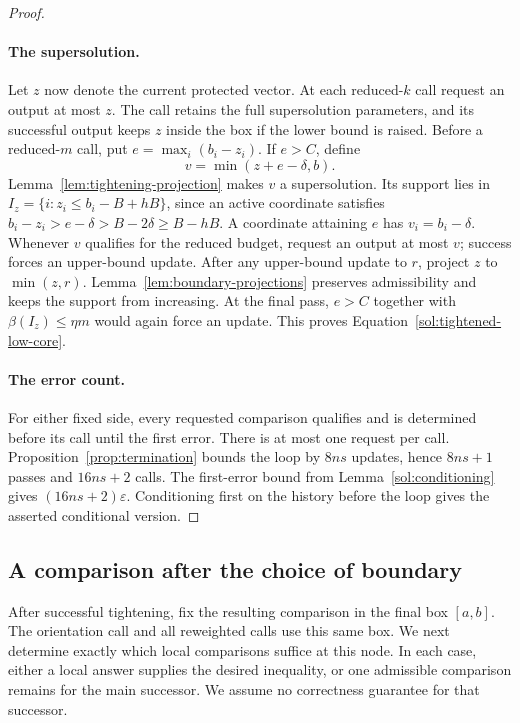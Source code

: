 \begin{proof}
\paragraph{The supersolution.}
Let \(z\) now denote the current protected vector. At each
reduced-\(k\) call request an output at most \(z\). The call
retains the full supersolution parameters, and its successful output
keeps \(z\) inside the box if the lower bound is raised.
Before a reduced-\(m\) call, put \(e=\max_i(b_i-z_i)\). If
\(e>C\), define
\[
 v=\min(z+e-\delta,b).
\]
Lemma~\ref{lem:tightening-projection} makes \(v\) a supersolution.
Its support lies in \(I_z=\{i:z_i\le b_i-B+hB\}\), since an
active coordinate satisfies
\(b_i-z_i>e-\delta>B-2\delta\ge B-hB\).
A coordinate attaining \(e\) has \(v_i=b_i-\delta\).
Whenever \(v\) qualifies for the reduced budget, request an output
at most \(v\); success forces an upper-bound update. After any
upper-bound update to \(r\), project \(z\) to \(\min(z,r)\).
Lemma~\ref{lem:boundary-projections} preserves admissibility and
keeps the support from increasing. At the final pass, \(e>C\)
together with \(\beta(I_z)\le\eta m\) would again force an update.
This proves Equation~\eqref{sol:tightened-low-core}.

\paragraph{The error count.}
For either fixed side, every requested comparison qualifies and is
determined before its call until the first error. There is at most
one request per call. Proposition~\ref{prop:termination} bounds the
loop by \(8ns\) updates, hence \(8ns+1\) passes and \(16ns+2\)
calls. The first-error bound from Lemma~\ref{sol:conditioning} gives
\((16ns+2)\varepsilon\). Conditioning first on the history before
the loop gives the asserted conditional version.
\end{proof}

\subsection{A comparison after the choice of boundary}

After successful tightening, fix the resulting comparison in the
final box \([a,b]\). The orientation call and all reweighted calls
use this same box. We next determine exactly which local comparisons
suffice at this node. In each case, either a local answer supplies
the desired inequality, or one admissible comparison remains for the
main successor. We assume no correctness guarantee for that successor.

